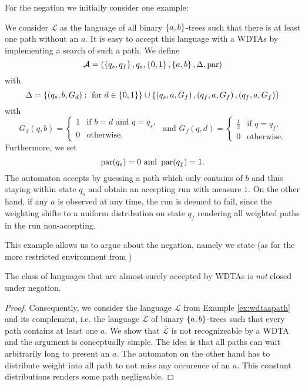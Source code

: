 For the negation we initially consider one example:
\begin{example}
  We consider $\mathcal{L}$ as the language of all binary $\left\{a,b\right\}$-trees 
  such that there is at least one path without an $a$. It is easy to accept 
  this language with a \acp{WDTA} by implementing a search of such a path. We 
  define
  \begin{equation*}
    \mathcal{A} = \left(
      \left\{q_{s}, q_{f}\right\}, q_{s}, \left\{0,1\right\}, \left\{a,b\right\}, \Delta, \operatorname{par}
    \right)
  \end{equation*}
  with
  \begin{equation*}
    \Delta = \left\{\left(q_{s}, b, G_{d}\right):\text{ for }d\in\left\{0,1\right\}\right\}\cup
    \left\{
      \left(q_{s}, a, G_{f}\right),\left(q_{f}, a, G_{f}\right),\left(q_{f}, a, G_{f}\right)
    \right\}
  \end{equation*}
  with
  \begin{equation*}
    G_{d}(q, b) = \begin{cases}
      1&\text{if }b = d\text{ and }q = q_{s},\\
      0&\text{otherwise},
    \end{cases}
    \text{ and }
    G_{f}(q, d) = \begin{cases}
      \frac{1}{2}&\text{if }q = q_{f},\\
      0&\text{otherwise}.
    \end{cases}
  \end{equation*}
  Furthermore, we set
  \begin{equation*}
    \operatorname{par}(q_{s}) = 0\text{ and }\operatorname{par}(q_{f}) = 1.
  \end{equation*}
  The automaton accepts by guessing a path which only contains of $b$ and thus
  staying within state $q_{s}$ and obtain an accepting run with measure $1$.
  On the other hand, if any $a$ is observed at any time, the run is deemed to
  fail, since the weighting shifts to a uniform distribution on state $q_{f}$
  rendering all weighted paths in the run non-accepting.
  \label{ex:wdtaapath}
\end{example}
This example allows us to argue about the negation, namely we state (as for the
more restricted environment from \cite[Proposition 15]{RandAutoInfTrees})
\begin{proposition}
  The class of languages that are almost-surely accepted by \acp{WDTA} is 
  \emph{not} closed under negation.
\end{proposition}
\begin{proof}
  Consequently, we consider the language $\mathcal{L}$ from Example 
  \ref{ex:wdtaapath} and its complement, i.e. the language 
  $\overline{\mathcal{L}}$ of binary $\left\{a,b\right\}$-trees such that every path 
  contains at least one $a$. We show that $\overline{\mathcal{L}}$ is not 
  recognizeable by a \ac{WDTA} and the argument is conceptually simple. The 
  idea is that all paths can wait arbitrarily long to present an $a$. The 
  automaton on the other hand has to distribute weight into all path to not
  miss any occurence of an $a$. This constant distributions renders some path
  negligeable.

\end{proof}

